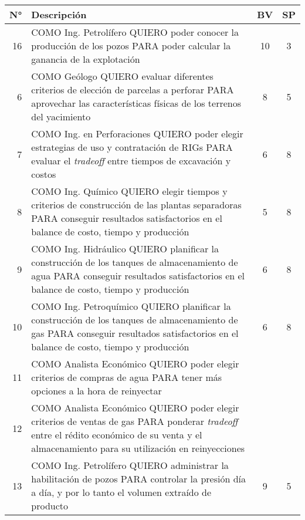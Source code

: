 \begin{center}
  \begin{tabular}{| r | p{13cm} | c | c | }
    \hline
    N° & Descripción & BV & SP\\  \hline

    16 & COMO Ing. Petrolífero QUIERO poder conocer la producción de los pozos PARA poder calcular la ganancia de la explotación & 10 & 3\\ \hline
    
    6 & COMO Geólogo QUIERO evaluar diferentes criterios de elección de parcelas a perforar PARA aprovechar las características físicas de los terrenos del yacimiento & 8 & 5\\  \hline

    7 & COMO Ing. en Perforaciones QUIERO poder elegir estrategias de uso y contratación de RIGs PARA evaluar el \textit{tradeoff} entre tiempos de excavación y costos & 6 & 8\\ \hline

    8 & COMO Ing. Químico QUIERO elegir tiempos y criterios de construcción de las plantas separadoras PARA conseguir resultados satisfactorios en el balance de costo, tiempo y producción & 5 & 8\\ \hline

    9 & COMO Ing. Hidráulico QUIERO planificar la construcción de los tanques de almacenamiento de agua PARA conseguir resultados satisfactorios en el balance de costo, tiempo y producción & 6 & 8\\ \hline

    10 & COMO Ing. Petroquímico QUIERO planificar la construcción de los tanques de almacenamiento de gas PARA conseguir resultados satisfactorios en el balance de costo, tiempo y producción & 6 & 8\\ \hline
      
    11 & COMO Analista Económico QUIERO poder elegir criterios de compras de agua PARA tener más opciones a la hora de reinyectar & & \\ \hline

    12 & COMO Analista Económico QUIERO poder elegir criterios de ventas de gas PARA ponderar \textit{tradeoff} entre el rédito económico de su venta y el almacenamiento para su utilización en reinyecciones & & \\ \hline

    13 & COMO Ing. Petrolífero QUIERO administrar la habilitación de pozos PARA controlar la presión día a día, y por lo tanto el volumen extraído de producto & 9 & 5\\ \hline


\end{tabular}
\end{center}
